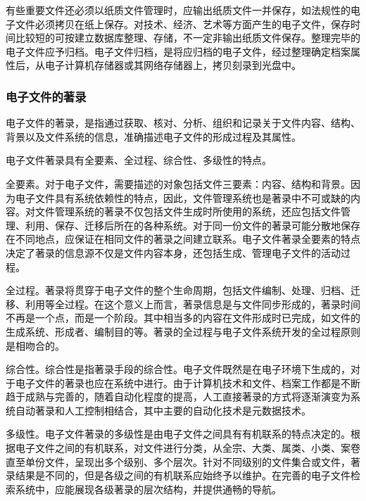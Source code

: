     有些重要文件还必须以纸质文件管理时，应输出纸质文件一并保存，如法规性的电子文件必须拷贝在纸上保存。对技术、经济、艺术等方面产生的电子文件，保存时间比较短的可按建立数据库整理、存储，不一定非输出纸质文件保存。整理完毕的电子文件应予归档。电子文件归档，是将应归档的电子文件，经过整理确定档案属性后，从电子计算机存储器或其网络存储器上，拷贝刻录到光盘中。

    \subsubsection {电子文件的著录}

    电子文件的著录，是指通过获取、核对、分析、组织和记录关于文件内容、结构、背景以及文件系统的信息，准确描述电子文件的形成过程及其属性。

    电子文件著录具有全要素、全过程、综合性、多级性的特点。

    \begin{enumerate.zh}
        \item 全要素。对于电子文件，需要描述的对象包括文件三要素：内容、结构和背景。因为电子文件具有系统依赖性的特点，因此，文件管理系统也是著录中不可或缺的内容。对文件管理系统的著录不仅包括文件生成时所使用的系统，还应包括文件管理、利用、保存、迁移后所在的各种系统。对于同一份文件的著录可能分散地保存在不同地点，应保证在相同文件的著录之间建立联系。电子文件著录全要素的特点决定了著录的信息源不仅是文件内容本身，还包括生成、管理电子文件的活动过程。
        \item 全过程。著录将贯穿于电子文件的整个生命周期，包括文件编制、处理、归档、迁移、利用等全过程。在这个意义上而言，著录信息是与文件同步形成的，著录时间不再是一个点，而是一个阶段。其中相当多的内容在文件形成时已完成，如文件的生成系统、形成者、编制目的等。著录的全过程与电子文件系统开发的全过程原则是相吻合的。
        \item 综合性。综合性是指著录手段的综合性。电子文件既然是在电子环境下生成的，对于电子文件的著录也应在系统中进行。由于计算机技术和文件、档案工作都是不断趋于成熟与完善的，随着自动化程度的提高，人工直接著录的方式将逐渐演变为系统自动著录和人工控制相结合，其中主要的自动化技术是元数据技术。
        \item 多级性。电子文件著录的多级性是由电子文件之间具有有机联系的特点决定的。根据电子文件之间的有机联系，对文件进行分类，从全宗、大类、属类、小类、案卷直至单份文件，呈现出多个级别、多个层次。针对不同级别的文件集合或文件，著录结果是不同的，但是各级之间的有机联系应始终予以维护。在完善的电子文件检索系统中，应能展现各级著录的层次结构，并提供通畅的导航。
    \end{enumerate.zh}

